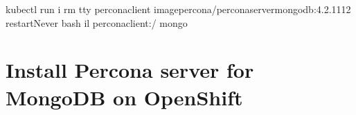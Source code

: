 \documentclass[letterpaper,10pt,english]{sphinxmanual}
\begin{document}
\begin{enumerate}
\begin{sphinxVerbatim}[commandchars=\\\{\}]
\PYGZdl{} kubectl run \PYGZhy{}i \PYGZhy{}\PYGZhy{}rm \PYGZhy{}\PYGZhy{}tty percona\PYGZhy{}client \PYGZhy{}\PYGZhy{}imagepercona/percona\PYGZhy{}server\PYGZhy{}mongodb:4.2.11\PYGZhy{}12 \PYGZhy{}\PYGZhy{}restartNever \PYGZhy{}\PYGZhy{} bash \PYGZhy{}il
percona\PYGZhy{}client:/\PYGZdl{} mongo 
\end{sphinxVerbatim}

\end{enumerate}


\chapter{Install Percona server for MongoDB on OpenShift}
\end{document}
